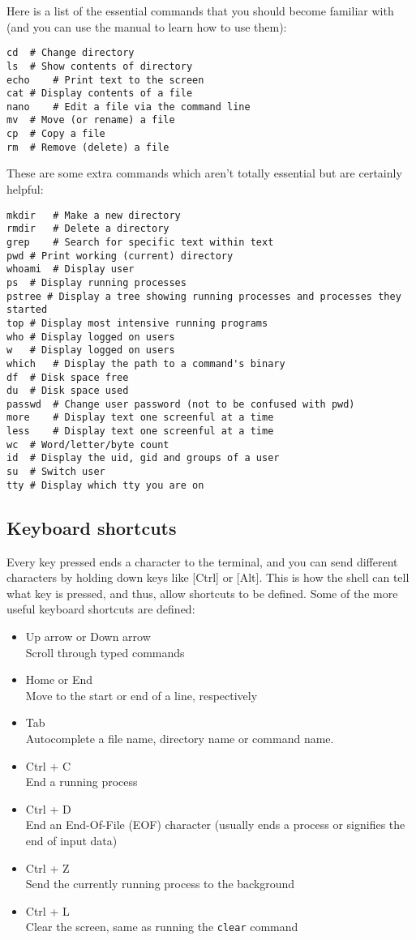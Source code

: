 \documentclass{article}
\begin{document}
Here is a list of the essential commands that you should become familiar with (and you can use the manual to learn how to use them): 
\begin{verbatim}
cd	# Change directory
ls	# Show contents of directory
echo	# Print text to the screen
cat	# Display contents of a file
nano	# Edit a file via the command line
mv	# Move (or rename) a file
cp	# Copy a file
rm	# Remove (delete) a file
\end{verbatim}
These are some extra commands which aren't totally essential but are certainly helpful:
\begin{verbatim}
mkdir	# Make a new directory
rmdir	# Delete a directory
grep	# Search for specific text within text
pwd	# Print working (current) directory
whoami	# Display user
ps	# Display running processes
pstree # Display a tree showing running processes and processes they started
top # Display most intensive running programs
who	# Display logged on users
w	# Display logged on users
which	# Display the path to a command's binary
df	# Disk space free
du	# Disk space used
passwd	# Change user password (not to be confused with pwd)
more	# Display text one screenful at a time
less	# Display text one screenful at a time
wc	# Word/letter/byte count
id	# Display the uid, gid and groups of a user
su	# Switch user
tty	# Display which tty you are on
\end{verbatim}

\subsection{Keyboard shortcuts}
Every key pressed ends a character to the terminal, and you can send different characters by holding down keys like [Ctrl] or [Alt]. This is how the shell can tell what key is pressed, and thus, allow shortcuts to be defined.
Some of the more useful keyboard shortcuts are defined: 
\begin{itemize}
\item Up arrow or Down arrow \\
Scroll through typed commands
\item Home or End \\
Move to the start or end of a line, respectively
\item Tab\\
Autocomplete a file name, directory name or command name.
\item Ctrl + C \\
End a running process 
\item Ctrl + D \\
End an End-Of-File (EOF) character (usually ends a process or signifies the end of input data) 
\item Ctrl + Z \\
Send the currently running process to the background 
\item Ctrl + L \\
Clear the screen, same as running the \texttt{clear} command
\end{itemize}
\end{document}
